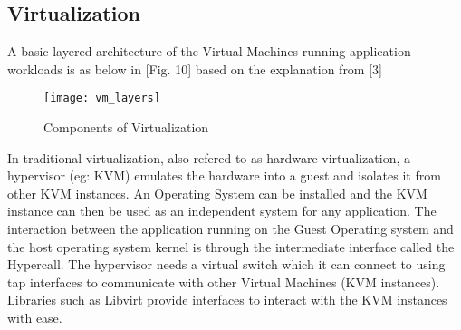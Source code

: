\subsection{Virtualization}

A basic layered architecture of the Virtual Machines running application workloads is as below in [Fig. 10] based on the explanation from [3]

\begin{figure}[h!]
    \centering
    \texttt{[image: vm\_layers]}
    \label{fig:figure9}
    \caption{Components of Virtualization}
\end{figure}

In traditional virtualization, also refered to as hardware virtualization, a hypervisor (eg: KVM) emulates the hardware into a guest and isolates it from other KVM instances. An Operating System can be installed and the KVM instance can then be used as an independent system for any application. The interaction between the application running on the Guest Operating system and the host operating system kernel is through the intermediate interface called the Hypercall. The hypervisor needs a virtual switch which it can connect to using tap interfaces to communicate with other Virtual Machines (KVM instances). Libraries such as Libvirt provide interfaces to interact with the KVM instances with ease.
